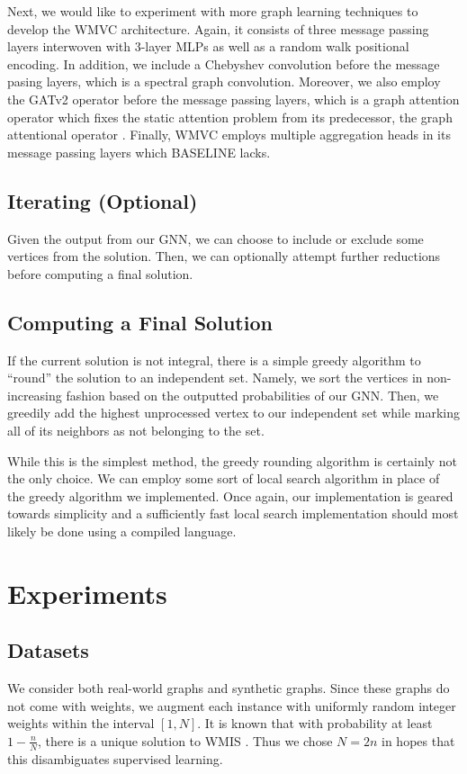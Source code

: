 \documentclass{article}
\begin{document}
Next, we would like to experiment with more graph learning techniques
to develop the WMVC architecture.
Again,
it consists of three message passing layers
interwoven with 3-layer MLPs
as well as a random walk positional encoding.
In addition,
we include a Chebyshev convolution \citet{defferrard2016conv} before the message pasing layers,
which is a spectral graph convolution.
Moreover,
we also employ the GATv2 operator \citet{brody2021attentive} before the message passing layers,
which is a graph attention operator which fixes the static attention problem from its predecessor,
the graph attentional operator \citet{velivckovic2017graph}.
Finally,
WMVC employs multiple aggregation heads \citet{corso2020principal, tailor2021we} in its message passing layers which BASELINE lacks.

\subsection{Iterating (Optional)}
Given the output from our GNN,
we can choose to include or exclude some vertices from the solution.
Then,
we can optionally attempt further reductions before computing a final solution.

\subsection{Computing a Final Solution}
If the current solution is not integral,
there is a simple greedy algorithm to ``round'' the solution to an independent set.
Namely, we sort the vertices in non-increasing fashion based on the outputted probabilities of our GNN.
Then, we greedily add the highest unprocessed vertex to our independent set
while marking all of its neighbors as not belonging to the set.

While this is the simplest method,
the greedy rounding algorithm is certainly not the only choice.
We can employ some sort of local search algorithm \citet{dahlum2016accelerating, chang2017computing} in place of the greedy algorithm we implemented.
Once again,
our implementation is geared towards simplicity
and a sufficiently fast local search implementation
should most likely be done using a compiled language.

\section{Experiments}
\subsection{Datasets}
We consider both real-world graphs and synthetic graphs.
Since these graphs do not come with weights,
we augment each instance with uniformly random integer weights within the interval $[1, N]$.
It is known that with probability at least $1-\frac nN$,
there is a unique solution to WMIS \citet{isolation}.
Thus we chose $N = 2n$ in hopes that this disambiguates supervised learning.
\end{document}
